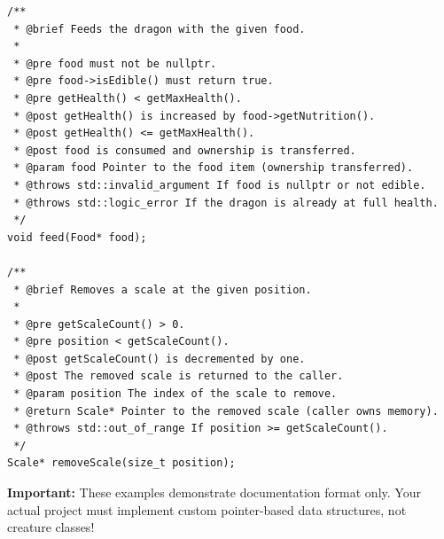 \begin{lstlisting}[style=cpp]
/**
 * @brief Feeds the dragon with the given food.
 *
 * @pre food must not be nullptr.
 * @pre food->isEdible() must return true.
 * @pre getHealth() < getMaxHealth().
 * @post getHealth() is increased by food->getNutrition().
 * @post getHealth() <= getMaxHealth().
 * @post food is consumed and ownership is transferred.
 * @param food Pointer to the food item (ownership transferred).
 * @throws std::invalid_argument If food is nullptr or not edible.
 * @throws std::logic_error If the dragon is already at full health.
 */
void feed(Food* food);

/**
 * @brief Removes a scale at the given position.
 *
 * @pre getScaleCount() > 0.
 * @pre position < getScaleCount().
 * @post getScaleCount() is decremented by one.
 * @post The removed scale is returned to the caller.
 * @param position The index of the scale to remove.
 * @return Scale* Pointer to the removed scale (caller owns memory).
 * @throws std::out_of_range If position >= getScaleCount().
 */
Scale* removeScale(size_t position);
\end{lstlisting}

\vspace{6pt}
\textbf{Important:} These examples demonstrate documentation format only. Your actual project must implement custom pointer-based data structures, not creature classes!
